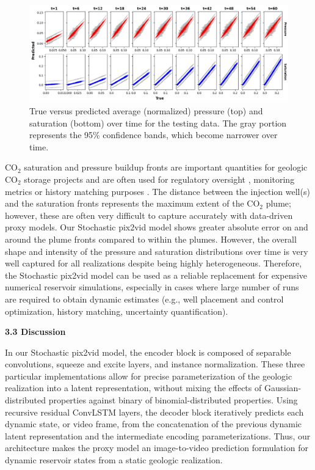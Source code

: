 \documentclass[10pt, twoside]{article}
\begin{document}
\begin{figure}
    \centering
    \includegraphics[width=16cm]{figures/r2ci.png}
    \caption{True versus predicted average (normalized) pressure (top) and saturation (bottom) over time for the testing data. The gray portion represents the 95\% confidence bands, which become narrower over time.}
    \label{r2ci}
\end{figure}

CO$_2$ saturation and pressure buildup fronts are important quantities for geologic CO$_2$ storage projects and are often used for regulatory oversight \cite{Li2016249, Chadwick20051385}, monitoring metrics or history matching purposes \cite{Chadwick20101171, dawuda2022geologic}. The distance between the injection well(s) and the saturation fronts represents the maximum extent of the CO$_2$ plume; however, these are often very difficult to capture accurately with data-driven proxy models. Our Stochastic pix2vid model shows greater absolute error on and around the plume fronts compared to within the plumes. However, the overall shape and intensity of the pressure and saturation distributions over time is very well captured for all realizations despite being highly heterogeneous. Therefore, the Stochastic pix2vid model can be used as a reliable replacement for expensive numerical reservoir simulations, especially in cases where large number of runs are required to obtain dynamic estimates (e.g., well placement and control optimization, history matching, uncertainty quantification).

\textbf{3.3 Discussion}

In our Stochastic pix2vid model, the encoder block is composed of separable convolutions, squeeze and excite layers, and instance normalization. These three particular implementations allow for precise parameterization of the geologic realization into a latent representation, without mixing the effects of Gaussian-distributed properties against binary of binomial-distributed properties. Using recursive residual ConvLSTM layers, the decoder block iteratively predicts each dynamic state, or video frame, from the concatenation of the previous dynamic latent representation and the intermediate encoding parameterizations. Thus, our architecture makes the proxy model an image-to-video prediction formulation for dynamic reservoir states from a static geologic realization.
\end{document}
